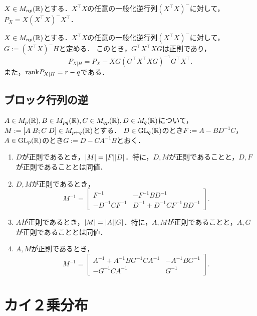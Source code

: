 \documentclass[uplatex,dvipdfmx]{jsreport}
\begin{document}
\begin{theorem}
    $X\in M_{np}(\mathbb{R})$とする．$X^\top X$の任意の一般化逆行列$(X^\top X)^-$に対して，$P_X=X(X^\top X)^-X^\top$．
\end{theorem}

\begin{theorem}
    $X\in M_{np}(\mathbb{R})$とする．$X^\top X$の任意の一般化逆行列$(X^\top X)^-$に対して，$G:=(X^\top X)^-H$と定める．
    このとき，$G^\top X^\top XG$は正則であり，\[P_{X|H}=P_X-XG(G^\top X^\top XG)^{-1}G^\top X^\top.\]
    また，$\mathrm{rank} P_{X|H}=r-q$である．
\end{theorem}

\subsection{ブロック行列の逆}

\begin{notation}
    $A\in M_p(\mathbb{R}),B\in M_{pq}(\mathbb{R}),C\in M_{qp}(\mathbb{R}),D\in M_{q}(\mathbb{R})$について，$M:=[A\;B;C\;D]\in M_{p+q}(\mathbb{R})$とする．
    $D\in\mathrm{GL}_q(\mathbb{R})$のとき$F:=A-BD^{-1}C$，$A\in\mathrm{GL}_p(\mathbb{R})$のとき$G:=D-CA^{-1}B$とおく．
\end{notation}

\begin{proposition}
    \begin{enumerate}
        \item $D$が正則であるとき，$\lvert M\rvert=\lvert F\rvert\lvert D\rvert$．特に，$D,M$が正則であることと，$D,F$が正則であることとは同値．
        \item $D,M$が正則であるとき，
        \[M^{-1}=\begin{bmatrix}F^{-1}&-F^{-1}BD^{-1}\\-D^{-1}CF^{-1}&D^{-1}+D^{-1}CF^{-1}BD^{-1}\end{bmatrix}.\]
        \item $A$が正則であるとき，$\lvert M\rvert=\lvert A\rvert\lvert G\rvert$．特に，$A,M$が正則であることと，$A,G$が正則であることとは同値．
        \item $A,M$が正則であるとき，
        \[M^{-1}=\begin{bmatrix}A^{-1}+A^{-1}BG^{-1}CA^{-1}&-A^{-1}BG^{-1}\\-G^{-1}CA^{-1}&G^{-1}\end{bmatrix}.\]
    \end{enumerate}
\end{proposition}

\section{カイ２乗分布}
\end{document}
